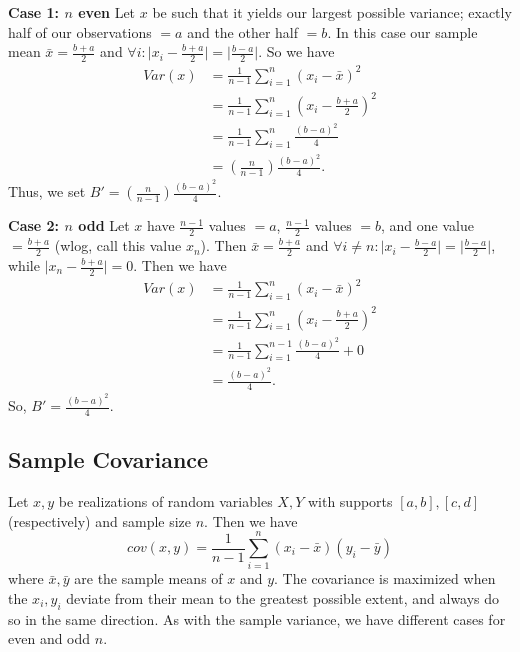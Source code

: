 \documentclass[11pt]{scrartcl} %
\begin{document}
\textbf{Case 1: $n$ even} \newline
Let $x$ be such that it yields our largest possible variance;
exactly half of our observations $= a$ and the other half $= b$.
In this case our sample mean $\bar{x} = \frac{b+a}{2}$ and
$\forall i: \vert x_i - \frac{b+a}{2} \vert = \vert \frac{b-a}{2} \vert$. So we have
\begin{align*}
	Var(x) &= \frac{1}{n-1} \sum_{i=1}^{n} (x_i - \bar{x})^2 \\
		   &= \frac{1}{n-1} \sum_{i=1}^{n} \left(x_i - \frac{b+a}{2}\right)^2 \\
		   &= \frac{1}{n-1} \sum_{i=1}^{n} \frac{(b-a)^2}{4} \\
		   &= \left(\frac{n}{n-1}\right) \frac{(b-a)^2}{4}.
\end{align*}
Thus, we set $B' = \left(\frac{n}{n-1}\right) \frac{(b-a)^2}{4}$.

\textbf{Case 2: $n$ odd} \newline
Let $x$ have $\frac{n-1}{2}$ values $=a$, $\frac{n-1}{2}$ values $=b$, and one value $=\frac{b+a}{2}$
(wlog, call this value $x_n$). Then $\bar{x} = \frac{b+a}{2}$ and
$\forall i \neq n: \vert x_i - \frac{b-a}{2} \vert = \vert \frac{b-a}{2} \vert$, while
$\vert x_n - \frac{b+a}{2} \vert = 0$. Then we have
\begin{align*}
	Var(x) &= \frac{1}{n-1} \sum_{i=1}^{n} (x_i - \bar{x})^2 \\
		   &= \frac{1}{n-1} \sum_{i=1}^{n} \left(x_i - \frac{b+a}{2}\right)^2 \\
		   &= \frac{1}{n-1} \sum_{i=1}^{n-1} \frac{(b-a)^2}{4} + 0 \\
		   &= \frac{(b-a)^2}{4}.
\end{align*}
So, $B' = \frac{(b-a)^2}{4}$.

\subsection{Sample Covariance}
\label{subsec:Bprime_sample_covariance}
Let $x,y$ be realizations of random variables $X,Y$ with supports $[a,b], [c,d]$ (respectively)
and sample size $n$. Then we have
\[ cov(x,y) = \frac{1}{n-1} \sum_{i=1}^{n}(x_i-\bar{x})(y_i-\bar{y}) \]
where $\bar{x}, \bar{y}$ are the sample means of $x$ and $y$. The covariance is maximized
when the $x_i,y_i$ deviate from their mean to the greatest possible extent, and always do
so in the same direction. As with the sample variance, we have different cases for
even and odd $n$. \newline
\end{document}
